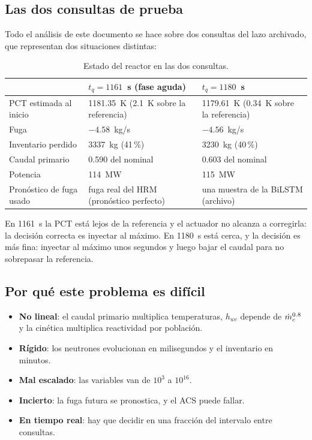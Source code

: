 \subsection{Las dos consultas de prueba}
Todo el análisis de este documento se hace sobre dos consultas del lazo archivado, que
representan dos situaciones distintas:
\begin{table}[H]\centering\small
\begin{tabularx}{\linewidth}{@{}l Y Y@{}}\toprule
& $t_q=1161$~s (fase aguda) & $t_q=1180$~s\\\midrule
PCT estimada al inicio & 1181.35~K (2.1~K sobre la referencia) & 1179.61~K (0.34~K sobre la referencia)\\
Fuga & $-4.58$~kg/s & $-4.56$~kg/s\\
Inventario perdido & 3337~kg (41\,\%) & 3230~kg (40\,\%)\\
Caudal primario & 0.590 del nominal & 0.603 del nominal\\
Potencia & 114~MW & 115~MW\\
Pronóstico de fuga usado & fuga real del HRM (pronóstico perfecto) & una muestra de la BiLSTM (archivo)\\\bottomrule
\end{tabularx}
\caption{Estado del reactor en las dos consultas.}
\end{table}
\noindent En 1161~s la PCT está lejos de la referencia y el actuador no alcanza a corregirla:
la decisión correcta es inyectar al máximo. En 1180~s está cerca, y la decisión es más fina:
inyectar al máximo unos segundos y luego bajar el caudal para no sobrepasar la referencia.

\subsection{Por qué este problema es difícil}
\begin{itemize}
  \item \textbf{No lineal}: el caudal primario multiplica temperaturas, $h_{wc}$ depende de
        $\dot m_c^{0.8}$ y la cinética multiplica reactividad por población.
  \item \textbf{Rígido}: los neutrones evolucionan en milisegundos y el inventario en minutos.
  \item \textbf{Mal escalado}: las variables van de $10^3$ a $10^{16}$.
  \item \textbf{Incierto}: la fuga futura se pronostica, y el ACS puede fallar.
  \item \textbf{En tiempo real}: hay que decidir en una fracción del intervalo entre consultas.
\end{itemize}

